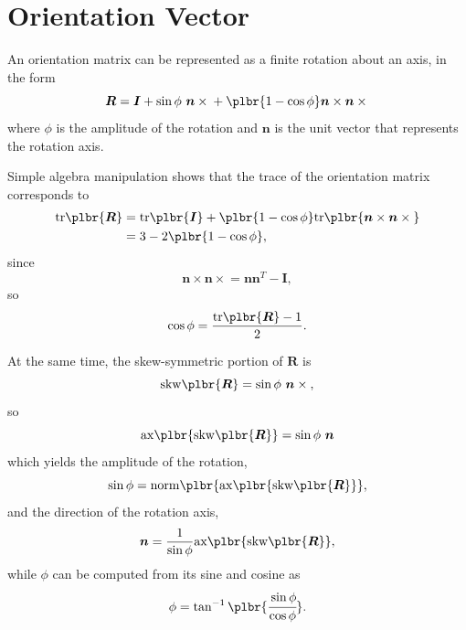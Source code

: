 \documentclass[10pt,fleqn,subeqn]{report}
\newcommand{\T}[1]{\bm{#1}}
\begin{document}
\section{Orientation Vector}
An orientation matrix can be represented as a finite rotation about 
an axis, in the form
\begin{equation}
	\T{R} = \T{I}
	+ \sin\phi \ \T{n}\times{}
	+ \plbr{1 - \cos\phi} \T{n}\times\T{n}\times{}
\end{equation}
where $\phi$ is the amplitude of the rotation and $\T{n}$ 
is the unit vector that represents the rotation axis.

Simple algebra manipulation shows that the trace of the orientation matrix
corresponds to 
\begin{align}
	\mathrm{tr}\plbr{\T{R}}
	&= \mathrm{tr}\plbr{\T{I}}
	+ \plbr{1 - \cos\phi}\mathrm{tr}\plbr{\T{n}\times\T{n}\times{}} \\
	&= 3 - 2 \plbr{1 - \cos\phi} ,
\end{align}
since
\begin{equation}
	\T{n}\times\T{n}\times{} = \T{n} \T{n}^T - \T{I} ,
\end{equation}
so
\begin{equation}
	\cos\phi = \frac{\mathrm{tr}\plbr{\T{R}} - 1}{2} .
\end{equation}

At the same time, the skew-symmetric portion of $\T{R}$ is
\begin{equation}
	\mathrm{skw}\plbr{\T{R}} = \sin\phi \ \T{n}\times{} ,
\end{equation}
so
\begin{equation}
	\mathrm{ax}\plbr{\mathrm{skw}\plbr{\T{R}}} = \sin\phi \ \T{n}
\end{equation}
which yields the amplitude of the rotation,
\begin{equation}
	\sin\phi
	= \mathrm{norm}\plbr{\mathrm{ax}\plbr{\mathrm{skw}\plbr{\T{R}}}} ,
\end{equation}
and the direction of the rotation axis,
\begin{equation}
	\T{n} = \frac{1}{\sin\phi}\mathrm{ax}\plbr{\mathrm{skw}\plbr{\T{R}}} ,
\end{equation}
while $\phi$ can be computed from its sine and cosine as
\begin{equation}
	\phi = \tan^{-1}\plbr{\cfrac{\sin\phi}{\cos\phi}} .
\end{equation}
\end{document}
